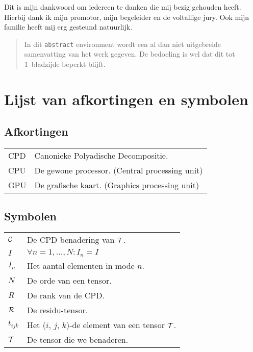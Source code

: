 \documentclass[master=cws ,masteroption=gs]{kulemt}
\begin{document}
\begin{preface}
  Dit is mijn dankwoord om iedereen te danken die mij bezig gehouden heeft.
  Hierbij dank ik mijn promotor, mijn begeleider en de voltallige jury.
  Ook mijn familie heeft mij erg gesteund natuurlijk.
\end{preface}

\tableofcontents*

\begin{abstract}
  In dit \texttt{abstract} environment wordt een al dan niet uitgebreide
  samenvatting van het werk gegeven. De bedoeling is wel dat dit tot
  1~bladzijde beperkt blijft.

  \lipsum[1]
\end{abstract}

\listoffiguresandtables
\chapter{Lijst van afkortingen en symbolen}
\section*{Afkortingen}
\begin{flushleft}
	\renewcommand{\arraystretch}{1.1}
  	\begin{tabularx}{\textwidth}{@{}p{12mm}X@{}}
    	CPD				& Canonieke Polyadische Decompositie.\\%
    	CPU				& De gewone processor. (Central processing unit)\\
    	GPU				& De grafische kaart. (Graphics processing unit)\\
  	\end{tabularx}
\end{flushleft}
\section*{Symbolen}
\begin{flushleft}
	\renewcommand{\arraystretch}{1.1}
	\begin{tabularx}{\textwidth}{@{}p{12mm}X@{}}
		$\mathcal{C}$	& De CPD benadering van $\mathcal{T}$.\\
		$I$				& $\forall n = 1, \ldots, N: I_n = I$\\
		$I_n$			& Het aantal elementen in mode $n$.\\
		$N$				& De orde van een tensor.\\
		$R$				& De rank van de CPD.\\
		$\mathcal{R}$		& De residu-tensor.\\
		$t_{ijk}$		& Het ($i$, $j$, $k$)-de element van een tensor $\mathcal{T}$.\\
		$\mathcal{T}$		& De tensor die we benaderen.
	\end{tabularx}
\end{flushleft}
\end{document}
